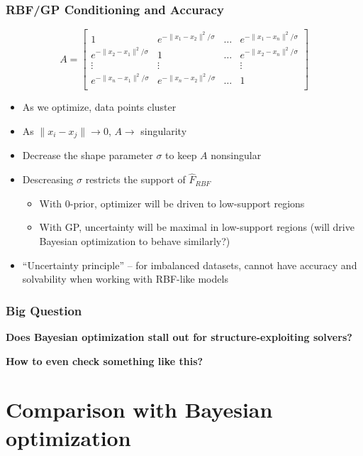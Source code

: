 \documentclass[aspectratio=169]{beamer}
\begin{document}
\begin{frame}\frametitle{RBF/GP Conditioning and Accuracy}
$$
A = 
\left[
\begin{array}{cccc}
1 & e^{-\|x_1 - x_2\|^2/\sigma} & \ldots & e^{-\|x_1 - x_n\|^2/\sigma} \\
e^{-\|x_2 - x_1\|^2/\sigma} & 1 & \ldots & e^{-\|x_2 - x_n\|^2/\sigma} \\
\vdots & \vdots &  & \vdots \\
e^{-\|x_n - x_1\|^2/\sigma} & e^{-\|x_n - x_2\|^2/\sigma} & \ldots & 1 \\
\end{array}
\right]
$$
\begin{itemize}
\item As we optimize, data points cluster
\item As $\|x_i - x_j\| \rightarrow 0$, $A \rightarrow$ singularity
\item Decrease the shape parameter $\sigma$ to keep $A$ nonsingular
\item Descreasing $\sigma$ restricts the support of ${\hat F}_{RBF}$
\begin{itemize}
\item With 0-prior, optimizer will be driven to low-support regions
\item With GP, uncertainty will be maximal in low-support regions (will drive Bayesian optimization to behave similarly?)
\end{itemize}
\item ``Uncertainty principle'' -- for imbalanced datasets, cannot
have accuracy and solvability when working with RBF-like models
\end{itemize}
\end{frame}

\begin{frame}\frametitle{Big Question}

\begin{center}

{\large \bf
Does Bayesian optimization stall out for structure-exploiting solvers?
}

\bigskip

{\large \bf
How to even check something like this?
}

\end{center}

\end{frame}

\section{Comparison with Bayesian optimization}
\end{document}
